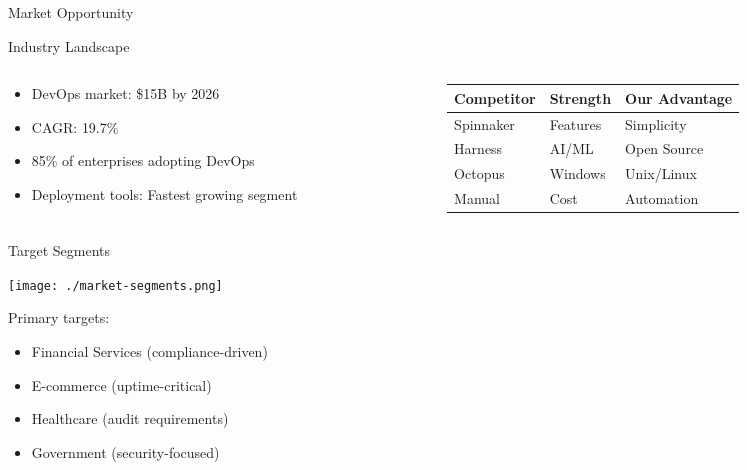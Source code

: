 \documentclass[presentation,aspectratio=169]{beamer}
\begin{document}
\begin{frame}[label={sec:org1a0e297}]{Market Opportunity}
\begin{block}{Industry Landscape}
\begin{columns}
\begin{column}{0.5\columnwidth}
\begin{itemize}
\item DevOps market: \alert{\$15B by 2026}
\item CAGR: \alert{19.7\%}
\item 85\% of enterprises adopting DevOps
\item Deployment tools: Fastest growing segment
\end{itemize}
\end{column}
\begin{column}{0.5\columnwidth}
\begin{center}
\begin{tabular}{lll}
Competitor & Strength & Our Advantage\\
\hline
Spinnaker & Features & Simplicity\\
Harness & AI/ML & Open Source\\
Octopus & Windows & Unix/Linux\\
Manual & Cost & Automation\\
\end{tabular}
\end{center}
\end{column}
\end{columns}
\end{block}
\begin{block}{Target Segments}
\begin{center}
\begin{center}
\texttt{[image: ./market-segments.png]}
\end{center}
\end{center}

Primary targets:
\begin{itemize}
\item Financial Services (compliance-driven)
\item E-commerce (uptime-critical)
\item Healthcare (audit requirements)
\item Government (security-focused)
\end{itemize}
\end{block}
\end{frame}
\end{document}
